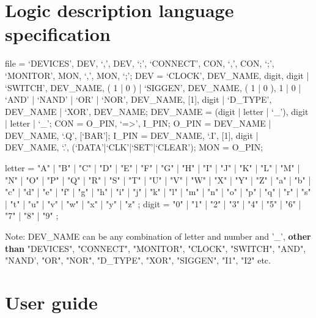 \documentclass[12pt]{article}
\newenvironment{metaverbatim}{\verbatim}{\endverbatim}
\begin{document}
\newpage
\section{Logic description language specification}
\begin{metaverbatim}
file =  `DEVICES', DEV, {`,', DEV}, `;', `CONNECT', CON, {`,', CON}, `;',
        `MONITOR', MON, {`,', MON}, `;';
DEV  =  `CLOCK', DEV_NAME, digit, {digit} |
        `SWITCH', DEV_NAME, ( 1 | 0 ) |
        `SIGGEN', DEV_NAME, ( 1 | 0 ), { 1 | 0 } |
        `AND' | `NAND' | `OR' | `NOR', DEV_NAME, [1], digit	|
        `D_TYPE', DEV_NAME |
        `XOR', DEV_NAME;
DEV_NAME  =	 (digit | letter | `_'), {digit | letter | `_'};
CON       =  O_PIN, `=>', I_PIN;
O_PIN     =  DEV_NAME |
             DEV_NAME, `.Q', [`BAR'];
I_PIN     =  DEV_NAME, `.I', [1], digit	|
             DEV_NAME, `.', (`DATA'|`CLK'|`SET'|`CLEAR');
MON       =  O_PIN;

letter = "A" | "B" | "C" | "D" | "E" | "F" | "G"
       | "H" | "I" | "J" | "K" | "L" | "M" | "N"
       | "O" | "P" | "Q" | "R" | "S" | "T" | "U"
       | "V" | "W" | "X" | "Y" | "Z" | "a" | "b"
       | "c" | "d" | "e" | "f" | "g" | "h" | "i"
       | "j" | "k" | "l" | "m" | "n" | "o" | "p"
       | "q" | "r" | "s" | "t" | "u" | "v" | "w"
       | "x" | "y" | "z" ;
digit = "0" | "1" | "2" | "3" | "4" | "5" | "6" | "7" | "8" | "9" ;

\end{metaverbatim}

\vspace{20mm}
Note: DEV\_NAME can be any combination of letter and number and '\_', \textbf{other than} "DEVICES", "CONNECT", "MONITOR", "CLOCK", "SWITCH", "AND", "NAND', "OR", "NOR", "D\_TYPE", "XOR", "SIGGEN", "I1", "I2" etc.

\section{User guide}

\newpage
\end{document}
